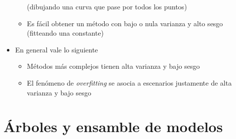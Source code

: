 \documentclass[leqno, 10pt, envcountsect]{beamer}
\numberwithin{equation}{section}
\theoremstyle{definition}
\theoremstyle{example}
\numberwithin{figure}{section}
\numberwithin{table}{section}
\let\olditem\item
\renewcommand{\item}{%
\olditem\vspace{1pt}}
\begin{document}
\begin{frame}[fragile=singleslide]
\begin{itemize}
\begin{itemize}
          (dibujando una curva que pase por todos los puntos)
        \item Es fácil obtener un método con bajo o nula varianza y alto sesgo
          (fitteando una constante)
      \end{itemize}
    \item En general vale lo siguiente
      \begin{itemize}
        \item Métodos más complejos tienen alta varianza y bajo sesgo
        \item El fenómeno de \textit{overfitting} se asocia a escenarios
          justamente de alta varianza y bajo sesgo
      \end{itemize}
  \end{itemize}
\end{frame}

\section{Árboles y ensamble de modelos}
\label{sec:arboles_y_modelos_de_}
\end{document}
